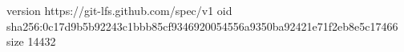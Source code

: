 version https://git-lfs.github.com/spec/v1
oid sha256:0c17d9b5b92243c1bbb85cf9346920054556a9350ba92421e71f2eb8e5c17466
size 14432
